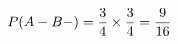 \documentclass[preview]{standalone}
\begin{document}
\begin{align*}
\special{dvisvgm:raw <g id='unique000'>}P(A-B-) = \frac{3}{4} \times \frac{3}{4} = \frac{9}{16}\special{dvisvgm:raw </g>}
\end{align*}
\end{document}
